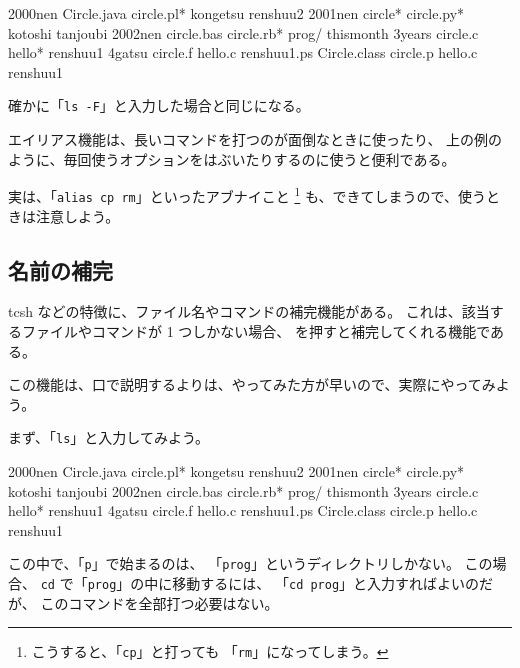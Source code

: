 \begin{progls}
2000nen         Circle.java     circle.pl*      kongetsu        renshuu2
2001nen         circle*         circle.py*      kotoshi         tanjoubi
2002nen         circle.bas      circle.rb*      prog/           thismonth
3years          circle.c        hello*          renshuu1
4gatsu          circle.f        hello.c         renshuu1.ps
Circle.class    circle.p        hello.c~        renshuu1~
%
\end{progls}

確かに「\texttt{ls -F}」と入力した場合と同じになる。

\bigskip

エイリアス機能は、長いコマンドを打つのが面倒なときに使ったり、
上の例のように、毎回使うオプションをはぶいたりするのに使うと便利である。

\bigskip

実は、「\texttt{alias cp rm}」といったアブナイこと
\footnote{こうすると、「\texttt{cp}」と打っても
「\texttt{rm}」になってしまう。}
も、できてしまうので、使うときは注意しよう。

\subsection{名前の補完}

tcsh などの特徴に、ファイル名やコマンドの補完機能がある。
これは、該当するファイルやコマンドが 1 つしかない場合、
  を押すと補完してくれる機能である。

この機能は、口で説明するよりは、やってみた方が早いので、実際にやってみよう。

まず、「\texttt{ls}」と入力してみよう。

\begin{progls}
2000nen         Circle.java     circle.pl*      kongetsu        renshuu2
2001nen         circle*         circle.py*      kotoshi         tanjoubi
2002nen         circle.bas      circle.rb*      prog/           thismonth
3years          circle.c        hello*          renshuu1
4gatsu          circle.f        hello.c         renshuu1.ps
Circle.class    circle.p        hello.c~        renshuu1~
%
\end{progls}

この中で、「\texttt{p}」で始まるのは、
「\texttt{prog}」というディレクトリしかない。
この場合、 \texttt{cd} で「\texttt{prog}」の中に移動するには、
「\texttt{cd prog}」と入力すればよいのだが、
このコマンドを全部打つ必要はない。

